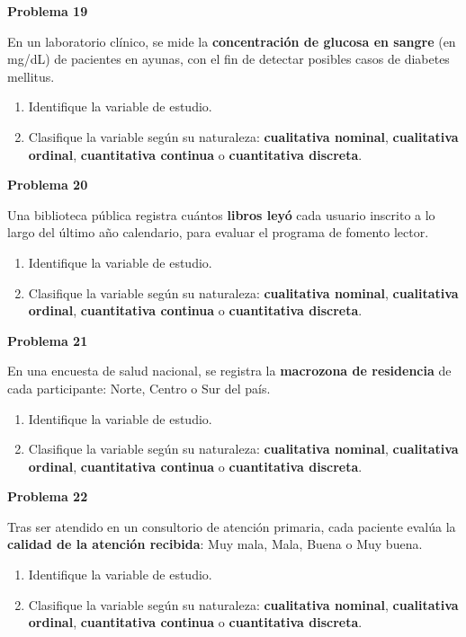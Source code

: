 \documentclass[10pt,letterpaper]{article}
\newcommand{\problema}[1]{%
  \vspace{2pt}%
  \begin{tcolorbox}[
    enhanced,
    colback=white,
    colframe=black,
    arc=0pt,
    boxrule=0pt,
    leftrule=2pt,
    left=6pt, right=6pt,
    top=1pt, bottom=1pt,
  ]
    {\normalsize\bfseries\sffamily #1}
  \end{tcolorbox}%
  \vspace{1pt}%
}
\begin{document}
\problema{Problema 19}
\noindent\sffamily\small En un laboratorio cl\'inico, se mide la \textbf{concentraci\'on de glucosa en sangre} (en mg/dL) de pacientes en ayunas, con el fin de detectar posibles casos de diabetes mellitus.
\begin{enumerate}[leftmargin=1.2cm, label=\textbf{\alph*)}, itemsep=0pt, topsep=2pt]
  \item Identifique la variable de estudio.
  \item Clasifique la variable seg\'un su naturaleza: \textbf{cualitativa nominal}, \textbf{cualitativa ordinal}, \textbf{cuantitativa continua} o \textbf{cuantitativa discreta}.
\end{enumerate}

\problema{Problema 20}
\noindent\sffamily\small Una biblioteca p\'ublica registra cu\'antos \textbf{libros ley\'o} cada usuario inscrito a lo largo del \'ultimo a\~no calendario, para evaluar el programa de fomento lector.
\begin{enumerate}[leftmargin=1.2cm, label=\textbf{\alph*)}, itemsep=0pt, topsep=2pt]
  \item Identifique la variable de estudio.
  \item Clasifique la variable seg\'un su naturaleza: \textbf{cualitativa nominal}, \textbf{cualitativa ordinal}, \textbf{cuantitativa continua} o \textbf{cuantitativa discreta}.
\end{enumerate}

\newpage

\problema{Problema 21}
\noindent\sffamily\small En una encuesta de salud nacional, se registra la \textbf{macrozona de residencia} de cada participante: Norte, Centro o Sur del pa\'is.
\begin{enumerate}[leftmargin=1.2cm, label=\textbf{\alph*)}, itemsep=0pt, topsep=2pt]
  \item Identifique la variable de estudio.
  \item Clasifique la variable seg\'un su naturaleza: \textbf{cualitativa nominal}, \textbf{cualitativa ordinal}, \textbf{cuantitativa continua} o \textbf{cuantitativa discreta}.
\end{enumerate}

\problema{Problema 22}
\noindent\sffamily\small Tras ser atendido en un consultorio de atenci\'on primaria, cada paciente eval\'ua la \textbf{calidad de la atenci\'on recibida}: Muy mala, Mala, Buena o Muy buena.
\begin{enumerate}[leftmargin=1.2cm, label=\textbf{\alph*)}, itemsep=0pt, topsep=2pt]
  \item Identifique la variable de estudio.
  \item Clasifique la variable seg\'un su naturaleza: \textbf{cualitativa nominal}, \textbf{cualitativa ordinal}, \textbf{cuantitativa continua} o \textbf{cuantitativa discreta}.
\end{enumerate}
\end{document}

